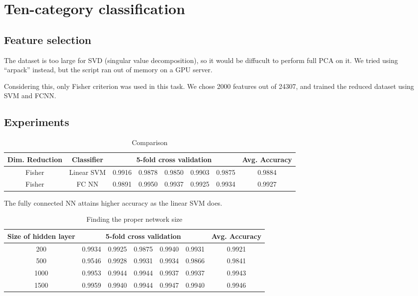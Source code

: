 \documentclass{article}
\begin{document}
\section{Ten-category classification}
{
    \subsection{Feature selection}
    {
        The dataset is too large for SVD (singular value decomposition), so it would be diffucult to perform full PCA on it.
        We tried using ``arpack'' instead, but the script ran out of memory on a GPU server. 

        Considering this, only Fisher criterion was used in this task.
        We chose 2000 features out of 24307, and trained the reduced dataset using SVM and FCNN.
    }

    \subsection{Experiments}
    {
        \begin{table}[!hbp]
            \centering
            \begin{tabular}{|c|c|c|c|c|c|c|c|}
            \hline
            Dim. Reduction & Classifier & \multicolumn{5}{|c|}{5-fold cross validation} & Avg. Accuracy \\
            \hline
            Fisher & Linear SVM & 0.9916 & 0.9878 & 0.9850 & 0.9903 & 0.9875 & 0.9884 \\
            \hline
            Fisher & FC NN & 0.9891 & 0.9950 & 0.9937 & 0.9925 & 0.9934 & 0.9927 \\
            \hline
            \end{tabular}
            \caption{Comparison}
        \end{table}

        The fully connected NN attains higher accuracy as the linear SVM does. 

        \begin{table}[!hbp]
            \centering
            \begin{tabular}{|c|c|c|c|c|c|c|}
            \hline
            Size of hidden layer & \multicolumn{5}{|c|}{5-fold cross validation} & Avg. Accuracy \\
            \hline
            200 & 0.9934 & 0.9925 & 0.9875 & 0.9940 & 0.9931 & 0.9921 \\
            \hline
            500 & 0.9546 & 0.9928 & 0.9931 & 0.9934 & 0.9866 & 0.9841 \\
            \hline
            1000 & 0.9953 & 0.9944 & 0.9944 & 0.9937 & 0.9937 & 0.9943 \\
            \hline
            1500 & 0.9959 & 0.9940 & 0.9944 & 0.9947 & 0.9940 & 0.9946 \\
            \hline
            \end{tabular}
            \caption{Finding the proper network size}
        \end{table}

}}
\end{document}

